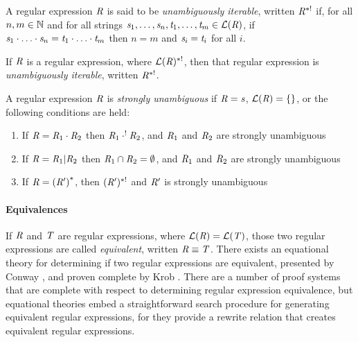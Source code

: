 \documentclass[numbers,10pt,preprint\ifanon ,nocopyrightspace\fi]{sigplanconf}
\begin{document}
A regular expression $\mathit{R}$ is said to be \textit{unambiguously iterable},
written $\mathit{R}^{*!}$ if,
for all $n,m\in\mathbb{N}$ and for all strings
$\mathit{s}_1,\ldots,\mathit{s}_n,\mathit{t}_1,\ldots,\mathit{t}_m\in\mathcal{L}(\mathit{R})$,
if
$\mathit{s}_1\cdot\ldots\cdot\mathit{s}_n=\mathit{t}_1\cdot\ldots\cdot\mathit{t}_m$
then $n=m$ and $\mathit{s}_i=\mathit{t}_i$ for all $i$.

If $\mathit{R}$ is a regular expression, where $\mathcal{L}(\mathit{R})^{*!}$,
then that regular expression is \textit{unambiguously iterable},
written $\mathit{R}^{*!}$.

A regular expression $\mathit{R}$ is \textit{strongly unambiguous} if $\mathit{R} =
\mathit{s}$, $\mathcal{L}(\mathit{R}) = \{\}$, or the following conditions are held:
\begin{enumerate}
\item If $\mathit{R} = \mathit{R}_1 \cdot \mathit{R}_2$ then $\mathit{R}_1 \cdot^!
  \mathit{R}_2$, and $\mathit{R}_1$ and $\mathit{R}_2$ are strongly unambiguous
\item If $\mathit{R} = \mathit{R}_1 | \mathit{R}_2$ then $\mathit{R}_1 \cap \mathit{R}_2 =
  \emptyset$, and $\mathit{R}_1$ and $\mathit{R}_2$ are strongly unambiguous
\item If $\mathit{R} = {(\mathit{R}')}^*$, then $(\mathit{R}')^{*!}$ and
  $\mathit{R}'$ is strongly unambiguous
\end{enumerate}



\paragraph*{Equivalences}
If $\mathit{R}$ and $\mathit{T}$ are regular expressions, where
$\mathcal{L}(\mathit{R})=\mathcal{L}(\mathit{T})$, those two regular expressions
are called \textit{equivalent}, written $\mathit{R}\equiv\mathit{T}$.
There exists an equational theory for determining if two regular expressions
are equivalent, presented by Conway \cite{conway}, and proven complete by Krob
\cite{Krob}.
There are a number of proof systems that are complete with respect to
determining regular
expression equivalence, but equational theories embed a straightforward search
procedure for generating equivalent regular expressions, for they provide a
rewrite relation that creates equivalent regular expressions.
\end{document}
